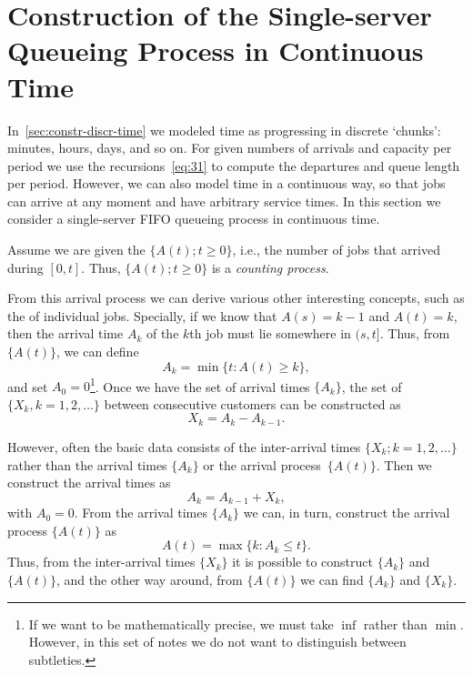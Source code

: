 \section
[Single-server Queueing Process in Continuous Time]
{Construction of the Single-server Queueing Process in Continuous Time}
\label{sec:constr-gg1-queu}



In~\cref{sec:constr-discr-time} we modeled time as progressing in discrete `chunks': minutes, hours, days, and so on.
For given numbers of arrivals and capacity per period we use the recursions~\cref{eq:31} to compute the departures and queue length per period.
However, we can also model time in a continuous way, so that  jobs can arrive at any moment and have arbitrary service times. 
In this section we consider a single-server FIFO queueing process in continuous time.

Assume we are given the  $\{A(t); t\geq 0\}$, i.e., the number of jobs that arrived during $[0,t]$.
Thus, $\{A(t); t\geq 0\}$ is a \emph{counting process}.

From this arrival process we can derive various other interesting concepts, such as the  of individual jobs.
Specially, if we know that $A(s) = k-1$ and $A(t) = k$, then the arrival time $A_k$ of the $k$th job must lie somewhere in $(s,t]$.
Thus, from $\{A(t)\}$, we can define
\begin{equation}\label{eq:27}
  A_k = \min\{t: A(t) \geq k\},
\end{equation}
and set $A_0 = 0$\footnote{If we want to be mathematically precise, we must take $\inf$ rather than $\min$.
  However, in this set of notes we do not want to distinguish between  subtleties.}.
Once we have the set of arrival times $\{A_k\}$, the set of  $\{X_k, k=1, 2, \ldots\}$ between consecutive customers can be constructed as
\begin{equation}
  X_k = A_k - A_{k-1}.
\end{equation}

However, often the basic data consists of the inter-arrival times $\{X_k; k=1,2,\ldots\}$ rather than the arrival times $\{A_k\}$ or the arrival process~$\{A(t)\}$.
Then we construct the arrival times as
\begin{equation*}
  A_k = A_{k-1} + X_k,
\end{equation*}
with $A_0 = 0$.
From the arrival times $\{A_k\}$ we can, in turn, construct the arrival process $\{A(t)\}$ as
\begin{equation}  \label{eq:2}
  A(t) = \max\{k: A_k \leq t\}.
\end{equation}
Thus, from the inter-arrival times $\{X_k\}$ it is possible to construct $\{A_k\}$ and $\{A(t)\}$, and the other way around, from $\{A(t)\}$ we can find $\{A_k\}$ and $\{X_k\}$.


